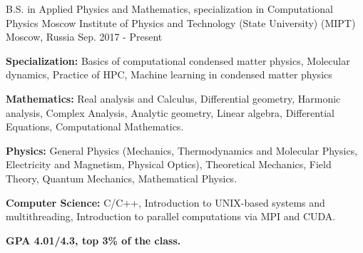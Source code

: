 

\begin{cventries}

  \cventry
    {B.S. in Applied Physics and Mathematics, specialization in Computational Physics} %
    {Moscow Institute of Physics and Technology (State University) (MIPT)} %
    {Moscow, Russia} %
    {Sep. 2017 - Present} %
    {
      \begin{cvitems} %
        \item {\textbf{Specialization:} Basics of computational condensed matter physics, Molecular dynamics, Practice of HPC, Machine learning in condensed matter physics}
        \item {\textbf{Mathematics:} Real analysis and Calculus, Differential geometry, Harmonic analysis, Complex Analysis, Analytic geometry, Linear algebra, Differential Equations, Computational Mathematics.}
        \item {\textbf{Physics:} General Physics (Mechanics, Thermodynamics and Molecular Physics, Electricity and Magnetism, Physical Optics), Theoretical Mechanics, Field Theory, Quantum Mechanics, Mathematical Physics.}
        \item {\textbf{Computer Science:}  C/C++, Introduction to UNIX-based systems and multithreading, Introduction to parallel computations via MPI and CUDA.
		\item {\textbf{GPA 4.01/4.3, top 3\% of the class.}}        
}
      \end{cvitems}
    }

\end{cventries}
